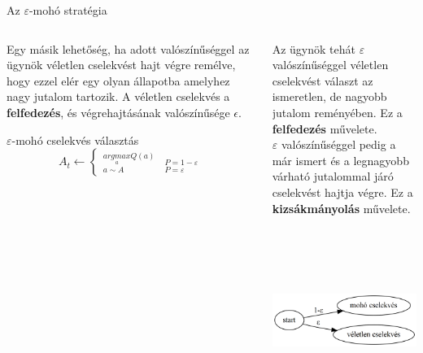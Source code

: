 \documentclass[english, aspectratio=169]{beamer}
\begin{document}
\begin{frame}{Az $\varepsilon$-mohó stratégia}
\begin{columns}
\begin{column}{.5\textwidth}
Egy másik lehetőség, ha adott valószínűséggel az ügynök véletlen cselekvést hajt végre remélve, hogy ezzel elér egy olyan állapotba amelyhez nagy jutalom tartozik. A véletlen cselekvés a \textbf{felfedezés}, és végrehajtásának valószínűsége $\epsilon$.
\begin{center}
\begin{block}{$\varepsilon$-mohó cselekvés választás}
\[
A_{t}\leftarrow\begin{cases}
_{a\sim A}^{\underset{a}{argmax}Q(a)} & _{P=\varepsilon}^{P=1-\varepsilon}\end{cases}
\]
\end{block}
\end{center}
\end{column}
\begin{column}{.5\textwidth}
Az ügynök tehát $\varepsilon$ valószínűséggel véletlen cselekvést választ az ismeretlen, de nagyobb jutalom reményében. Ez a \textbf{felfedezés} művelete.\\
$\varepsilon$ valószínűséggel pedig a már ismert és a legnagyobb várható jutalommal járó cselekvést hajtja végre. Ez a \textbf{kizsákmányolás} művelete.
\begin{center}
\includegraphics[width=7cm, height=6cm, keepaspectratio]{graphs/solving_1.png}
\end{center}
\end{column}
\end{columns}
\end{frame}
\end{document}
